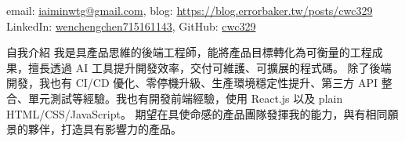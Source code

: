 \documentclass[
	11pt,
]{resume}
\begin{document}
%
email: \href{mailto:iaiminwtg@gmail.com}{iaiminwtg@gmail.com}, blog: \href{https://blog.errorbaker.tw/posts/cwc329}{https://blog.errorbaker.tw/posts/cwc329} \\
LinkedIn: \href{https://www.linkedin.com/in/wenchengchen715161143}{wenchengchen715161143}, GitHub: \href{https://github.com/cwc329}{cwc329}


\begin{rSection}{自我介紹}
    我是具產品思維的後端工程師，能將產品目標轉化為可衡量的工程成果，擅長透過 AI 工具提升開發效率，交付可維護、可擴展的程式碼。
    除了後端開發，我也有 CI/CD 優化、零停機升級、生產環境穩定性提升、第三方 API 整合、單元測試等經驗。我也有開發前端經驗，使用 React.js 以及 plain HTML/CSS/JavaScript。
    期望在具使命感的產品團隊發揮我的能力，與有相同願景的夥伴，打造具有影響力的產品。
\end{rSection}
\end{document}
